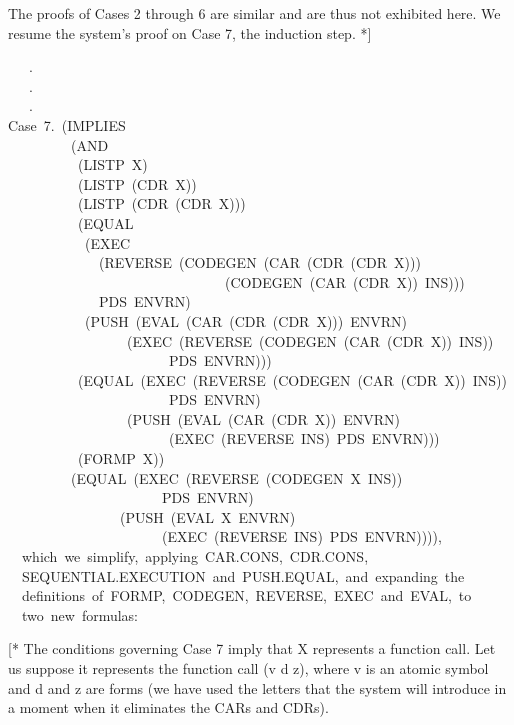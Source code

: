 \documentclass[11pt]{book}
\newenvironment{pubasis}{\begin{flushleft}\ttfamily\small}{\normalsize\rmfamily\end{flushleft}}
\begin{document}
The proofs of Cases 2 through 6 are similar and are thus not
exhibited here.  We resume the system's proof on Case 7, the induction step. *]
\begin{pubasis}
~~~.\\
~~~.\\
~~~.\\

Case~7.~(IMPLIES\\
~~~~~~~~~(AND\\
~~~~~~~~~~(LISTP~X)\\
~~~~~~~~~~(LISTP~(CDR~X))\\
~~~~~~~~~~(LISTP~(CDR~(CDR~X)))\\
~~~~~~~~~~(EQUAL\\
~~~~~~~~~~~(EXEC\\
~~~~~~~~~~~~~(REVERSE~(CODEGEN~(CAR~(CDR~(CDR~X)))\\
~~~~~~~~~~~~~~~~~~~~~~~~~~~~~~~(CODEGEN~(CAR~(CDR~X))~INS)))\\
~~~~~~~~~~~~~PDS~ENVRN)\\
~~~~~~~~~~~(PUSH~(EVAL~(CAR~(CDR~(CDR~X)))~ENVRN)\\
~~~~~~~~~~~~~~~~~(EXEC~(REVERSE~(CODEGEN~(CAR~(CDR~X))~INS))\\
~~~~~~~~~~~~~~~~~~~~~~~PDS~ENVRN)))\\
~~~~~~~~~~(EQUAL~(EXEC~(REVERSE~(CODEGEN~(CAR~(CDR~X))~INS))\\
~~~~~~~~~~~~~~~~~~~~~~~PDS~ENVRN)\\
~~~~~~~~~~~~~~~~~(PUSH~(EVAL~(CAR~(CDR~X))~ENVRN)\\
~~~~~~~~~~~~~~~~~~~~~~~(EXEC~(REVERSE~INS)~PDS~ENVRN)))\\
~~~~~~~~~~(FORMP~X))\\
~~~~~~~~~(EQUAL~(EXEC~(REVERSE~(CODEGEN~X~INS))\\
~~~~~~~~~~~~~~~~~~~~~~PDS~ENVRN)\\
~~~~~~~~~~~~~~~~(PUSH~(EVAL~X~ENVRN)\\
~~~~~~~~~~~~~~~~~~~~~~(EXEC~(REVERSE~INS)~PDS~ENVRN)))),\\

~~which~we~simplify,~applying~CAR.CONS,~CDR.CONS,\\
~~SEQUENTIAL.EXECUTION~and~PUSH.EQUAL,~and~expanding~the\\
~~definitions~of~FORMP,~CODEGEN,~REVERSE,~EXEC~and~EVAL,~to\\
~~two~new~formulas:\\
\end{pubasis}
[* The conditions governing Case 7 imply that X represents a function call.
Let us suppose it represents the function call (v d z), where v
is an atomic symbol and d and z are forms (we have used the
letters that the system will introduce in a moment when it
eliminates the CARs and CDRs).
\end{document}
